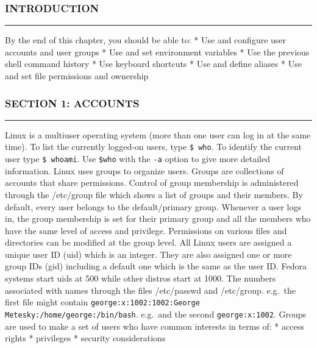 \subsubsection{INTRODUCTION}\label{introduction-8}

\begin{center}\rule{3in}{0.4pt}\end{center}

By the end of this chapter, you should be able to: * Use and configure
user accounts and user groups * Use and set environment variables * Use
the previous shell command history * Use keyboard shortcuts * Use and
define aliases * Use and set file permissions and ownership

\subsubsection{SECTION 1: ACCOUNTS}\label{section-1-accounts}

\begin{center}\rule{3in}{0.4pt}\end{center}

Linux is a multiuser operating system (more than one user can log in at
the same time). To list the currently logged-on users, type
\texttt{\$ who}. To identify the current user type \texttt{\$ whoami}.
Use \texttt{\$who} with the \texttt{-a} option to give more detailed
information. Linux uses groups to organize users. Groups are collections
of accounts that share permissions. Control of group membership is
administered through the /etc/group file which shows a list of groups
and their members. By default, every user belongs to the default/primary
group. Whenever a user logs in, the group membership is set for their
primary group and all the members who have the same level of access and
privilege. Permissions on various files and directories can be modified
at the group level. All Linux users are assigned a unique user ID (uid)
which is an integer. They are also assigned one or more group IDs (gid)
including a default one which is the same as the user ID. Fedora systems
start uids at 500 while other distros start at 1000. The numbers
associated with names through the files /etc/passwd and /etc/group.
e.g.~the first file might contain
\texttt{george:x:1002:1002:George Metesky:/home/george:/bin/bash}.
e.g.~and the second \texttt{george:x:1002}. Groups are used to make a
set of users who have common interests in terms of: * access rights *
privileges * security considerations

